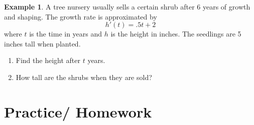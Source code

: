\documentclass{article}[12pt]
\theoremstyle{definition}
\theoremstyle{example}
\newtheorem{example}{Example}[section]
\theoremstyle{theorem}
\begin{document}
\begin{example}
A tree nursery usually sells a certain shrub after 6 years of growth and shaping. The growth rate is approximated by 
\[h'(t)=.5t+2\] where $t$ is the time in years and $h$ is the height in inches. The seedlings are 5 inches tall when planted. 
\begin{enumerate}
\item Find the height after $t$ years. 
\vspace{2cm}
\item How tall are the shrubs when they are sold?

\end{enumerate}
\end{example}
\newpage
\section{Practice/ Homework}
\end{document}
